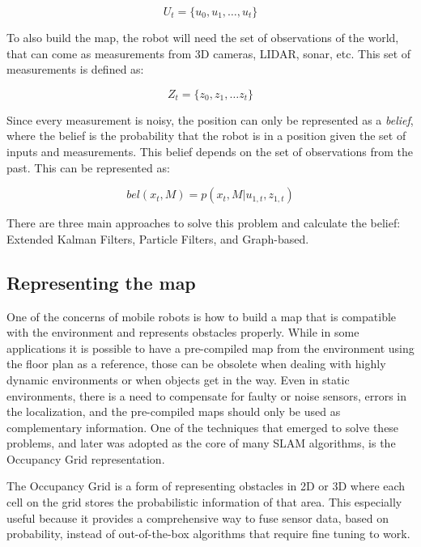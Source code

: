 \begin{equation}
    U_t = \{u_0, u_1, \dots, u_t\}
\end{equation}

To also build the map, the robot will need the set of observations of the world, that can come as measurements from 3D cameras, LIDAR, sonar, etc. This set of measurements is defined as:

\begin{equation}
    Z_t = \{z_0, z_1, \dots z_t\}
\end{equation}

Since every measurement is noisy, the position can only be represented as a \textit{belief}, where the belief is the probability that the robot is in a position given the set of inputs and measurements. This belief depends on the set of observations from the past. This can be represented as:

\begin{equation}
    bel(x_t, M) = p(x_t, M | u_{1, t}, z_{1,t})
\end{equation}

There are three main approaches to solve this problem and calculate the belief: Extended Kalman Filters, Particle Filters, and Graph-based.

\subsection{Representing the map}

One of the concerns of mobile robots is how to build a map that is compatible with the environment and represents obstacles properly. While in some applications it is possible to have a pre-compiled map from the environment using the floor plan as a reference, those can be obsolete when dealing with highly dynamic environments or when objects get in the way. Even in static environments, there is a need to compensate for faulty or noise sensors, errors in the localization, and the pre-compiled maps should only be used as complementary information. One of the techniques that emerged to solve these problems, and later was adopted as the core of many SLAM algorithms, is the Occupancy Grid \cite{elfes1989using} representation.

The Occupancy Grid is a form of representing obstacles in 2D or 3D where each cell on the grid stores the probabilistic information of that area. This especially useful because it provides a comprehensive way to fuse sensor data, based on probability, instead of out-of-the-box algorithms that require fine tuning to work.

